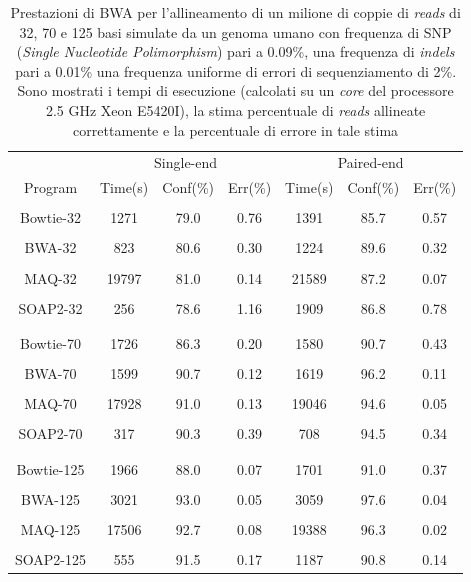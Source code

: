 \documentclass[conference]{IEEEtran}
\begin{document}
\begin{table}
\begin{center}
\begin{tabular}{|c|ccc|ccc|}
	& \multicolumn{3}{c|}{Single-end} & \multicolumn{3}{c|}{Paired-end} \\
Program & Time(s) & Conf(\%) & Err(\%) & Time(s) & Conf(\%) & Err(\%)\\
\hline{}
& & & & & & \\
Bowtie-32 & 1271 & 79.0 & 0.76 & 1391 & 85.7 & 0.57 \\
& & & & & & \\
BWA-32 & 823 & 80.6 & 0.30 & 1224 & 89.6 & 0.32 \\
& & & & & & \\
MAQ-32 & 19797 & 81.0 & 0.14 & 21589 & 87.2 & 0.07 \\
& & & & & & \\
SOAP2-32 & 256 & 78.6 & 1.16 & 1909 & 86.8 & 0.78 \\
& & & & & & \\
\hline{}
& & & & & & \\
Bowtie-70 & 1726 & 86.3 & 0.20 & 1580 & 90.7 & 0.43 \\
& & & & & & \\
BWA-70 & 1599 & 90.7 & 0.12 & 1619 & 96.2 & 0.11 \\
& & & & & & \\
MAQ-70 & 17928 & 91.0 & 0.13 & 19046 & 94.6 & 0.05 \\
& & & & & & \\
SOAP2-70 & 317 & 90.3 & 0.39 & 708 & 94.5 & 0.34 \\
& & & & & & \\
\hline{}
& & & & & & \\
Bowtie-125 & 1966 & 88.0 & 0.07 & 1701 & 91.0 & 0.37 \\
& & & & & & \\
BWA-125 & 3021 & 93.0 & 0.05 & 3059 & 97.6 & 0.04 \\
& & & & & & \\
MAQ-125 & 17506 & 92.7 & 0.08 & 19388 & 96.3 & 0.02 \\
& & & & & & \\
SOAP2-125 & 555 & 91.5 & 0.17 & 1187 & 90.8 & 0.14 \\
\end{tabular}

\end{center}
\caption{Prestazioni di BWA per l'allineamento di un milione di coppie di \textit{reads} di 32, 70 e 125 basi simulate da un genoma umano con frequenza di SNP (\textit{Single Nucleotide Polimorphism}) pari a 0.09\%, una frequenza di \textit{indels} pari a 0.01\% una frequenza uniforme di errori di sequenziamento di 2\%. Sono mostrati i tempi di esecuzione (calcolati su un \textit{core} del processore 2.5 GHz Xeon E5420I), la stima percentuale di \textit{reads} allineate correttamente e la percentuale di errore in tale stima}
\label{tab:BWA1}
\end{table}
\end{document}
